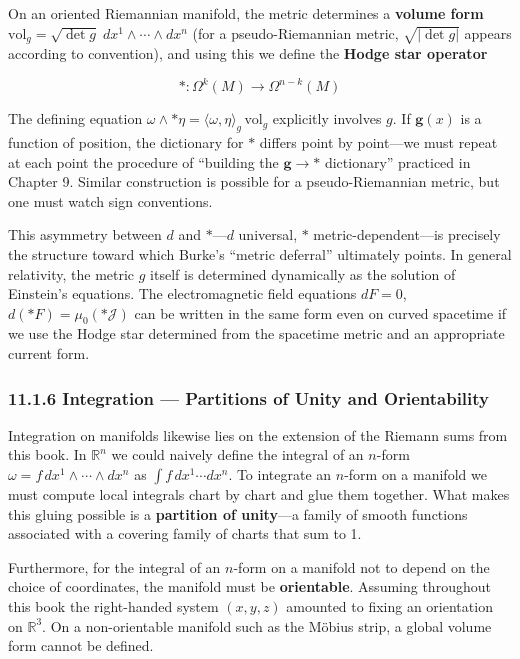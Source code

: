\documentclass[a4paper,12pt,openany]{book}
\begin{document}
On an oriented Riemannian manifold, the metric determines a
\textbf{volume form}
\(\mathrm{vol}_g = \sqrt{\det g}\;dx^1 \wedge \cdots \wedge dx^n\) (for
a pseudo-Riemannian metric, \(\sqrt{|\det g|}\) appears according to
convention), and using this we define the \textbf{Hodge star operator}

\[\ast: \Omega^k(M) \to \Omega^{n-k}(M)\]

The defining equation
\(\omega \wedge \ast\eta = \langle\omega,\eta\rangle_g\,\mathrm{vol}_g\)
explicitly involves \(g\). If \(\mathbf{g}(x)\) is a function of
position, the dictionary for \(\ast\) differs point by point—we must
repeat at each point the procedure of ``building the
\(\mathbf{g} \to \ast\) dictionary'' practiced in Chapter 9. Similar
construction is possible for a pseudo-Riemannian metric, but one must
watch sign conventions.

This asymmetry between \(d\) and \(\ast\)—\(d\) universal, \(\ast\)
metric-dependent—is precisely the structure toward which Burke's
``metric deferral'' ultimately points. In general relativity, the metric
\(g\) itself is determined dynamically as the solution of Einstein's
equations. The electromagnetic field equations \(dF = 0\),
\(d(\ast F) = \mu_0(\ast\mathcal{J})\) can be written in the same form
even on curved spacetime if we use the Hodge star determined from the
spacetime metric and an appropriate current form.

\hypertarget{integration-partitions-of-unity-and-orientability}{%
\subsubsection{11.1.6 Integration — Partitions of Unity and
Orientability}\label{integration-partitions-of-unity-and-orientability}}

Integration on manifolds likewise lies on the extension of the Riemann
sums from this book. In \(\mathbb{R}^n\) we could naively define the
integral of an \(n\)-form \(\omega = f\,dx^1 \wedge \cdots \wedge dx^n\)
as \(\int f\,dx^1 \cdots dx^n\). To integrate an \(n\)-form on a
manifold we must compute local integrals chart by chart and glue them
together. What makes this gluing possible is a \textbf{partition of
unity}—a family of smooth functions associated with a covering family
of charts that sum to 1.

Furthermore, for the integral of an \(n\)-form on a manifold not to
depend on the choice of coordinates, the manifold must be
\textbf{orientable}. Assuming throughout this book the right-handed
system \((x,y,z)\) amounted to fixing an orientation on
\(\mathbb{R}^3\). On a non-orientable manifold such as the Möbius strip,
a global volume form cannot be defined.
\end{document}
